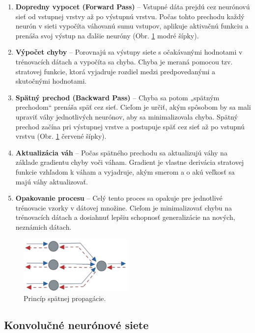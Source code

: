 \begin{enumerate}
  \item \textbf{Dopredny vypocet (Forward Pass)} – Vstupné dáta prejdú cez neurónovú sieť od vstupnej vrstvy až po výstupnú vrstvu. Počas tohto prechodu každý neurón v sieti vypočíta váhovanú sumu vstupov, aplikuje aktivačnú funkciu a prenáša svoj výstup na ďalšie neuróny (Obr. \ref{fig:backpropagation} modré šípky).
  \item \textbf{Výpočet chyby} – Porovnajú sa výstupy siete s očakávanými hodnotami v trénovacích dátach a vypočíta sa chyba. Chyba je meraná pomocou tzv. stratovej funkcie, ktorá vyjadruje rozdiel medzi predpovedanými a skutočnými hodnotami.
  \item \textbf{Spätný prechod (Backward Pass)} – Chyba sa potom „spätným prechodom“ prenáša späť cez sieť. Cieľom je určiť, akým spôsobom by sa mali upraviť váhy jednotlivých neurónov, aby sa minimalizovala chyba. Spätný prechod začína pri výstupnej vrstve a postupuje späť cez sieť až po vstupnú vrstvu (Obr. \ref{fig:backpropagation} červené šípky).
  \item \textbf{Aktualizácia váh} – Počas spätného prechodu sa aktualizujú váhy na základe gradientu chyby voči váham. Gradient je vlastne derivácia stratovej funkcie vzhľadom k váham a vyjadruje, akým smerom a o akú veľkosť sa majú váhy aktualizovať.
  \item \textbf{Opakovanie procesu} – Celý tento proces sa opakuje pre jednotlivé trénovacie vzorky v dátovej množine. Cieľom je minimalizovať chybu na trénovacích dátach a dosiahnuť lepšiu schopnosť generalizácie na nových, neznámich dátach.
\end{enumerate}

\begin{figure}[H]
\centerline{\includegraphics[width=0.5\textwidth]{images/forward_back.png}}
\caption{Princíp spätnej propagácie.}
\label{fig:backpropagation}
\end{figure}

\subsection{Konvolučné neurónové siete}

